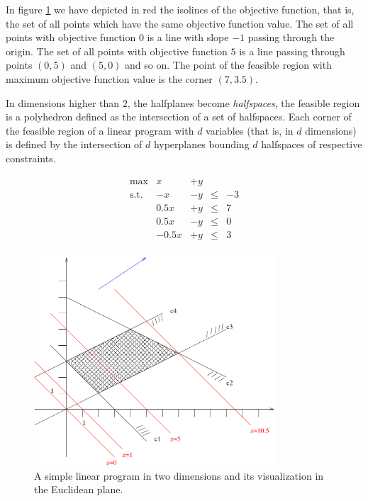 \documentclass{article}
\begin{document}
In figure \ref{fig:GeomIntuition} we have depicted in red the isolines of the objective function, that is, the
set of all points which have the same objective function value. The set of all points with objective function $0$ is
a line with slope $-1$ passing through the origin. The set of all points with objective function $5$ is a 
line passing through points $(0,5)$ and $(5,0)$ and so on. The point of the feasible region
with maximum objective function value is the corner $(7, 3.5)$.

In dimensions higher than $2$, the halfplanes become \emph{halfspaces}, the feasible region is a polyhedron defined as the intersection of a set of halfspaces. Each corner of the feasible region of a linear program with $d$ variables (that is, in $d$ dimensions) is defined by the intersection of $d$ hyperplanes bounding $d$ halfspaces of respective constraints.

\begin{figure}[t]
\begin{minipage}{4cm}
\[
\begin{matrix}
	\max		& x	&+	y	&&\\ 
	\mbox{s.t.}	&-x	&	-y	&\leq&-3\\ 
			&0.5x	&	+y	&\leq&7\\ 
			&0.5x	&	-y	& \leq&0\\
			&-0.5x	&	+y	& \leq&3\\
\end{matrix}
\]
\end{minipage}
\hspace{1cm}
\begin{minipage}{10cm}
\includegraphics[width=9cm]{Figs/GeomIntuition.pdf}
\end{minipage}
\caption{A simple linear program in two dimensions and its visualization in the
	Euclidean plane.\label{fig:GeomIntuition}}
\end{figure}
\end{document}
